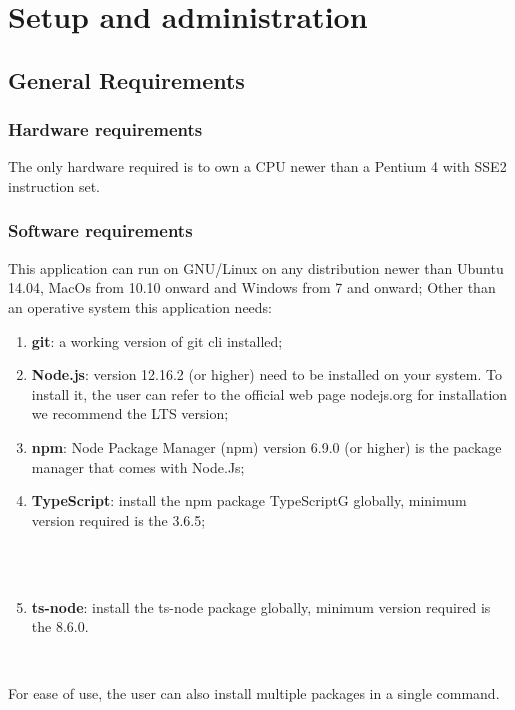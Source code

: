 \section{Setup and administration}
\subsection{General Requirements}
\subsubsection{Hardware requirements}
The only hardware required is to own a CPU newer than a Pentium 4 with SSE2 instruction set.
\subsubsection{Software requirements}
This application can run on GNU/Linux on any distribution newer than Ubuntu 14.04, MacOs from 10.10 onward and Windows from 7 and onward;
Other than an operative system this application needs:
\begin{enumerate}
	\item \textbf{git}: a working version of git cli installed;
    \item \textbf{Node.js}: version 12.16.2 (or higher) need to be installed on your system. To install it, the user can refer to the official web page nodejs.org for installation we recommend the LTS version;
    \item \textbf{npm}: Node Package Manager (npm) version 6.9.0 (or higher) is the package manager that comes with Node.Js;
    \item \textbf{TypeScript}: install the npm package TypeScriptG globally, minimum version required is the 3.6.5;\\\\ \centerline{}\\
    \item \textbf{ts-node}: install the ts-node package globally, minimum version required is the 8.6.0. \newline\newline \centerline{}\\
\end{enumerate}
For ease of use, the user can also install multiple packages in a single command.
\begin{center}
\end{center}
